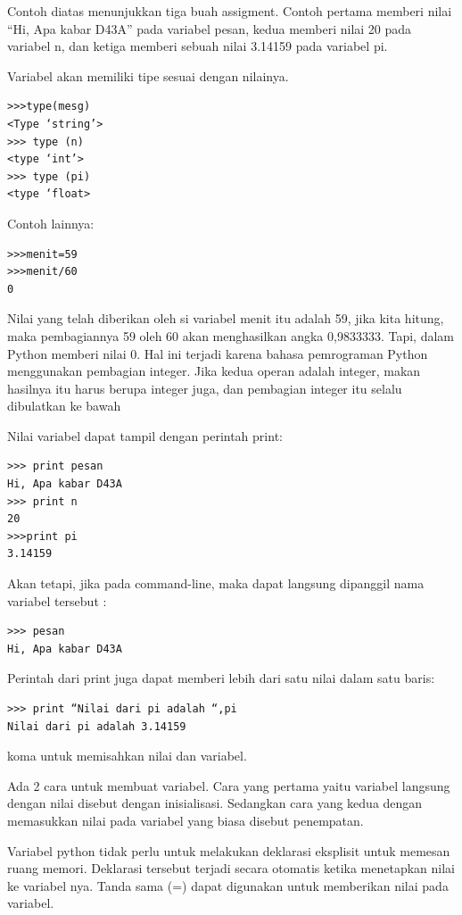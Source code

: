 Contoh diatas menunjukkan tiga buah assigment. Contoh pertama memberi nilai 
``Hi, Apa kabar D43A'' pada variabel pesan, 
kedua memberi nilai 20 pada variabel n, dan ketiga memberi sebuah nilai 3.14159 pada variabel pi.
\cite{utami2004logika}

Variabel akan memiliki tipe  sesuai dengan nilainya.
\begin{verbatim}
>>>type(mesg)
<Type ‘string’>
>>> type (n)
<type ‘int’>
>>> type (pi)
<type ‘float>
\end{verbatim}

Contoh lainnya:
\begin{verbatim}
>>>menit=59
>>>menit/60
0
\end{verbatim}
Nilai yang telah diberikan oleh si variabel menit itu adalah 59, jika kita hitung, maka pembagiannya 59 oleh 60 akan menghasilkan angka 0,9833333. Tapi, dalam Python memberi nilai 0. Hal ini terjadi karena bahasa pemrograman Python menggunakan pembagian integer. Jika kedua operan adalah integer, makan hasilnya itu harus berupa integer juga, dan pembagian integer itu selalu dibulatkan ke bawah

Nilai variabel dapat tampil dengan perintah print:
\begin{verbatim}
>>> print pesan
Hi, Apa kabar D43A
>>> print n
20
>>>print pi
3.14159
\end{verbatim}

Akan tetapi, jika pada command-line, maka dapat langsung dipanggil nama variabel tersebut :
\begin{verbatim}
>>> pesan
Hi, Apa kabar D43A
\end{verbatim}

Perintah dari print juga dapat memberi lebih dari satu nilai dalam satu baris:
\begin{verbatim}
>>> print “Nilai dari pi adalah “,pi
Nilai dari pi adalah 3.14159
\end{verbatim}

koma untuk memisahkan nilai dan variabel.\cite{utami2004logika}

Ada 2 cara untuk membuat variabel. Cara yang pertama yaitu variabel langsung dengan nilai disebut dengan inisialisasi. Sedangkan cara yang kedua dengan memasukkan nilai pada variabel yang biasa disebut penempatan.\cite{santoso2009bahasa}

Variabel python tidak perlu untuk melakukan deklarasi eksplisit untuk memesan ruang memori. Deklarasi tersebut terjadi secara otomatis ketika menetapkan nilai ke variabel nya.
Tanda sama (=) dapat digunakan untuk memberikan nilai pada variabel.


